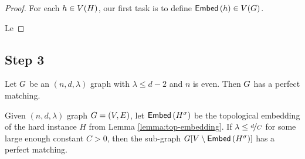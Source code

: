 \documentclass[11pt]{article}
\newcommand{\EnDeeLambda}{(n, d, \lambda)}
\newcommand{\Subdivision}[2]{{#1}^{#2}}
\begin{document}
\begin{lemma}\label{lemma:top-embedding}	
\end{lemma}

\begin{proof}
For each $h \in V(H)$, our first task is to define $\mathsf{Embed}\left(h\right) \in V(G)$.

Le
	
\end{proof}

\subsection{Step 3}


\begin{lemma}\label{lemma:expanders-minimal-matching}\citep[Theorem 4.3]{krivelevich2006pseudo}
Let $G$ be an $\EnDeeLambda$ graph with $\lambda \leq d - 2$	and $n$ is even. Then $G$ has a perfect matching.
\end{lemma}

\begin{lemma}\label{lemma:perfect-matching}
Given $\EnDeeLambda$ graph $G=(V,E)$, let $\Embedding{\Subdivision{H}{\sigma}}$ be the topological embedding of the hard instance $H$ from Lemma \ref{lemma:top-embedding}.
If $\lambda \leq \nicefrac{d}{C}$ for some large enough constant $C > 0$, then the sub-graph $\Graph[V \setminus \Embedding{\Subdivision{H}{\sigma}}]$ has a perfect matching.	
\end{lemma}
\end{document}
